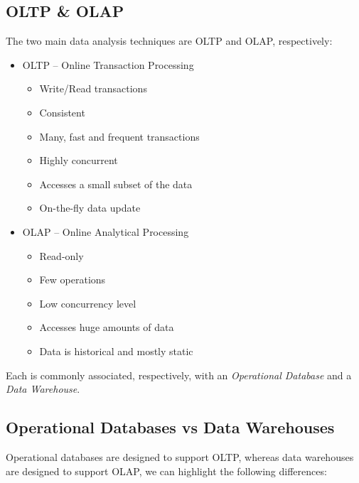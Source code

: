 \documentclass[openright, twoside, twocolumn]{report}
\begin{document}
\subsection{OLTP \& OLAP}

The two main data analysis techniques are OLTP and OLAP, respectively:

\begin{itemize}
  \item OLTP -- Online Transaction Processing
  \begin{itemize}
    \item Write/Read transactions
    \item Consistent
    \item Many, fast and frequent transactions
    \item Highly concurrent
    \item Accesses a small subset of the data
    \item On-the-fly data update
  \end{itemize}
  \item OLAP -- Online Analytical Processing
  \begin{itemize}
    \item Read-only
    \item Few operations
    \item Low concurrency level
    \item Accesses huge amounts of data
    \item Data is historical and mostly static
  \end{itemize}
\end{itemize}

Each is commonly associated, respectively, with an \emph{Operational Database}
and a \emph{Data Warehouse}.

\subsection{Operational Databases vs Data Warehouses}

Operational databases are designed to support OLTP, whereas data warehouses are designed to support OLAP,
we can highlight the following differences:
\end{document}
